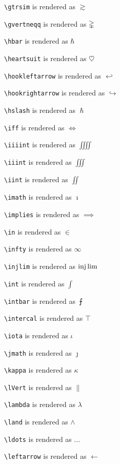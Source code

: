 \texttt{\textbackslash gtrsim} is rendered as $\gtrsim$

\texttt{\textbackslash gvertneqq} is rendered as $\gvertneqq$

\texttt{\textbackslash hbar} is rendered as $\hbar$

\texttt{\textbackslash heartsuit} is rendered as $\heartsuit$

\texttt{\textbackslash hookleftarrow} is rendered as $\hookleftarrow$

\texttt{\textbackslash hookrightarrow} is rendered as $\hookrightarrow$

\texttt{\textbackslash hslash} is rendered as $\hslash$

\texttt{\textbackslash iff} is rendered as $\iff$

\texttt{\textbackslash iiiint} is rendered as $\iiiint$

\texttt{\textbackslash iiint} is rendered as $\iiint$

\texttt{\textbackslash iint} is rendered as $\iint$

\texttt{\textbackslash imath} is rendered as $\imath$

\texttt{\textbackslash implies} is rendered as $\implies$

\texttt{\textbackslash in} is rendered as $\in$

\texttt{\textbackslash infty} is rendered as $\infty$

\texttt{\textbackslash injlim} is rendered as $\injlim$

\texttt{\textbackslash int} is rendered as $\int$

\texttt{\textbackslash intbar} is rendered as $\intbar$

\texttt{\textbackslash intercal} is rendered as $\intercal$

\texttt{\textbackslash iota} is rendered as $\iota$

\texttt{\textbackslash jmath} is rendered as $\jmath$

\texttt{\textbackslash kappa} is rendered as $\kappa$

\texttt{\textbackslash lVert} is rendered as $\lVert$

\texttt{\textbackslash lambda} is rendered as $\lambda$

\texttt{\textbackslash land} is rendered as $\land$

\texttt{\textbackslash ldots} is rendered as $\ldots$

\texttt{\textbackslash leftarrow} is rendered as $\leftarrow$

